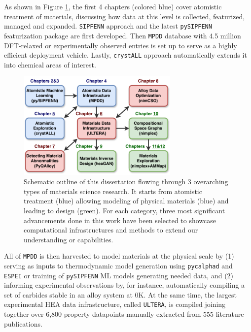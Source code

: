 As shown in Figure \ref{intro:fig:outline}, the first 4 chapters (colored blue) cover atomistic treatment of materials, discussing how data at this level is collected, featurized, managed and expanded. \texttt{SIPFENN} approach and the latest \texttt{pySIPFENN} featurization package are first developed. Then \texttt{MPDD} database with 4.5 million DFT-relaxed or experimentally observed entries is set up to serve as a highly efficient deployment vehicle. Lastly, \texttt{crystALL} approach automatically extends it into chemical areas of interest.

\begin{figure}[H]
    \centering
    \includegraphics[width=0.7\textwidth]{intro/DissertationOutline.pdf}
    \caption{Schematic outline of this dissertation flowing through 3 overarching types of materials science research. It starts from atomistic treatment (blue) allowing modeling of physical materials (blue) and leading to design (green). For each category, three most significant advancements done in this work have been selected to showcase computational infrastructures and methods to extend our understanding or capabilities.}
    \label{intro:fig:outline}
\end{figure}

All of \texttt{MPDD} is then harvested to model materials at the physical scale by (1) serving as inputs to thermodynamic model generation using \texttt{pycalphad} \cite{Otis2017Pycalphad:Python} and \texttt{ESPEI} \cite{Bocklund2019ESPEICuMg} or training of \texttt{pySIPFENN} ML models generating needed data, and (2) informing experimental observations by, for instance, automatically compiling a set of carbides stable in an alloy system at 0K. At the same time, the largest experimental HEA data infrastructure, called \texttt{ULTERA}, is compiled joining together over 6,800 property datapoints manually extracted from 555 literature publications. 

